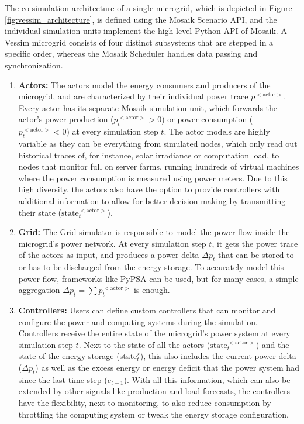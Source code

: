 The co-simulation architecture of a single microgrid, which is depicted in Figure \ref{fig:vessim_architecture}, is defined using the Mosaik Scenario API, and the individual simulation units implement the high-level Python API of Mosaik. A Vessim microgrid consists of four distinct subsystems that are stepped in a specific order, whereas the Mosaik Scheduler handles data passing and synchronization.
\begin{enumerate}
    \item \textbf{Actors:} The actors model the energy consumers and producers of the microgrid, and are characterized by their individual power trace $p^{<\text{actor}>}$. Every actor has its separate Mosaik simulation unit, which forwards the actor's power production ($p_t^{<\text{actor}>} > 0$) or power consumption ($p_t^{<\text{actor}>} < 0$) at every simulation step $t$. The actor models are highly variable as they can be everything from simulated nodes, which only read out historical traces of, for instance, solar irradiance or computation load, to nodes that monitor full on server farms, running hundreds of virtual machines where the power consumption is measured using power meters. Due to this high diversity, the actors also have the option to provide controllers with additional information to allow for better decision-making by transmitting their state ($\text{state}_t^{<\text{actor}>}$).
    \item  \textbf{Grid:} The Grid simulator is responsible to model the power flow inside the microgrid's power network. At every simulation step $t$, it gets the power trace of the actors as input, and produces a power delta $\Delta p_t$ that can be stored to or has to be discharged from the energy storage. To accurately model this power flow, frameworks like PyPSA \cite{brown2017pypsa} can be used, but for many cases, a simple aggregation $\Delta p_t = \sum{p_t^{<\text{actor}>}}$ is enough.
    \item \textbf{Controllers:} Users can define custom controllers that can monitor and configure the power and computing systems during the simulation. Controllers receive the entire state of the microgrid's power system at every simulation step $t$. Next to the state of all the actors ($\text{state}_t^{<\text{actor}>}$) and the state of the energy storage ($\text{state}_t^{s}$), this also includes the current power delta ($\Delta p_t$) as well as the excess energy or energy deficit that the power system had since the last time step ($e_{t-1}$). With all this information, which can also be extended by other signals like production and load forecasts, the controllers have the flexibility, next to monitoring, to also reduce consumption by throttling the computing system or tweak the energy storage configuration.

\end{enumerate}
